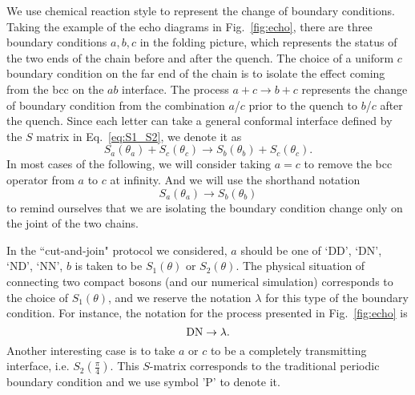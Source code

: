 
We use chemical reaction style to represent the change of boundary conditions. Taking the example of the echo diagrams in Fig.~\ref{fig:echo}, there are three boundary conditions $a,b,c$ in the folding picture, which represents the status of the two ends of the chain before and after the quench. The choice of a uniform $c$ boundary condition on the far end of the chain is to isolate the effect coming from the bcc on the $ab$ interface. The process $a + c \rightarrow b + c$ represents the change of boundary condition from the combination $a$/$c$ prior to the quench to $b$/$c$ after the quench. Since each letter can take a general conformal interface defined by the $S$ matrix in Eq.~\eqref{eq:S1_S2}, we denote it as
\begin{equation}
\label{eq:Full_notation_rand()}
S_a( \theta_a ) + S_c( \theta_c) \rightarrow S_b( \theta_b )  + S_c( \theta_c ) .
\end{equation}
In most cases of the following, we will consider taking $a = c$ to remove the bcc operator from $a$ to $c$ at infinity. And we will use the shorthand notation
\begin{equation}
S_a( \theta_a ) \rightarrow S_b( \theta_b )
\end{equation}
to remind ourselves that we are isolating the boundary condition change only on the joint of the two chains. 

In the ``cut-and-join" protocol we considered, $a$ should be one of `DD', `DN', `ND', `NN', $b$ is taken to be $S_1( \theta )$ or $S_2( \theta )$. The physical situation of connecting two compact bosons (and our numerical simulation) corresponds to the choice of $S_1( \theta)$, and we reserve the notation $\lambda$ for this type of the boundary condition. For instance, the notation for the process presented in Fig.~\ref{fig:echo} is
\begin{equation}
\label{eq:DNDN}
 {\rm DN} \rightarrow \lambda.
\end{equation}
Another interesting case is to take $a$ or $c$ to be a completely transmitting interface, i.e. $S_2( \frac{\pi}{4} )$. This $S$-matrix corresponds to the traditional periodic boundary condition and we use symbol 'P' to denote it. 


